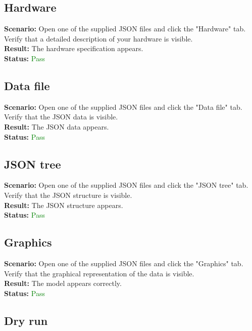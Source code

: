 \documentclass[a4paper, 11pt, article]{report}
\begin{document}
\subsection{Hardware}

\noindent \textbf{Scenario:} Open one of the supplied JSON files and click the "Hardware" tab. Verify that a detailed description of your hardware is visible.
\\
\noindent \textbf{Result:} The hardware specification appears.
\\
\noindent \textbf{Status:} \textcolor{green}{Pass}

\subsection{Data file}

\noindent \textbf{Scenario:} Open one of the supplied JSON files and click the "Data file" tab. Verify that the JSON data is visible.
\\
\noindent \textbf{Result:} The JSON data appears.
\\
\noindent \textbf{Status:} \textcolor{green}{Pass}

\subsection{JSON tree}

\noindent \textbf{Scenario:} Open one of the supplied JSON files and click the "JSON tree" tab. Verify that the JSON structure is visible.
\\
\noindent \textbf{Result:} The JSON structure appears.
\\
\noindent \textbf{Status:} \textcolor{green}{Pass}

\subsection{Graphics}

\noindent \textbf{Scenario:} Open one of the supplied JSON files and click the "Graphics" tab. Verify that the graphical representation of the data is visible.
\\
\noindent \textbf{Result:} The model appears correctly.
\\
\noindent \textbf{Status:} \textcolor{green}{Pass}

\subsection{Dry run}
\end{document}
